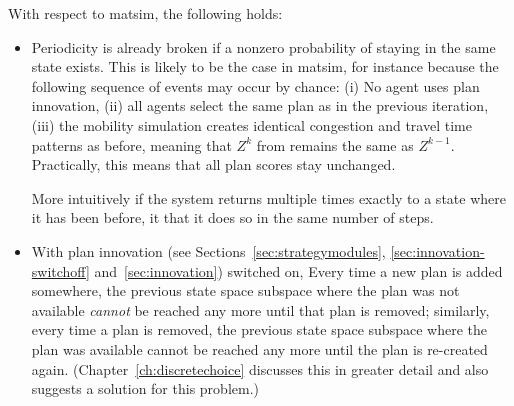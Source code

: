 With respect to \gls{matsim}, the following holds: %
\begin{itemize}

\item Periodicity is already broken if a nonzero probability of staying in the
same state exists. This is likely to be the case in \gls{matsim},
for instance because the following sequence of events may occur by chance:
(i) No agent uses plan innovation, (ii) all agents select the same plan as in
the previous iteration, (iii) the mobility simulation creates identical
congestion and travel time patterns as before, meaning that $Z^k$ from
 remains the same as $Z^{k-1}$. Practically, this
means that all plan scores stay unchanged.

More intuitively if the system returns
multiple times exactly to a state where it has been before, it  that it does so in the same number of steps.



\item With plan innovation (see Sections~\ref{sec:strategymodules},
\ref{sec:innovation-switchoff} and~\ref{sec:innovation}) switched on, 
Every time a new plan is added somewhere, the previous state space subspace
where the plan was not available \emph{cannot} be reached any more until that
plan is removed; similarly, every time a plan is removed, the previous state
space subspace where the plan was available cannot be reached any more until the
plan is re-created again. (Chapter~\ref{ch:discretechoice} discusses this in
greater detail and also suggests a solution for this problem.)


\end{itemize}
